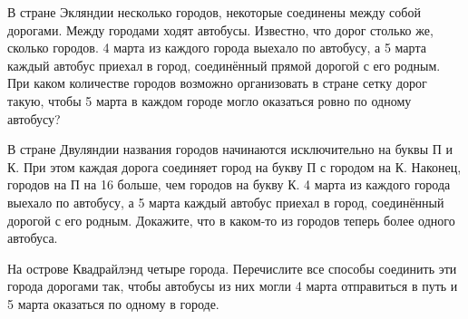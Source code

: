 ﻿
\begin{itemize}

\itA В стране Экляндии несколько городов, некоторые соединены между собой дорогами.
Между городами ходят автобусы. Известно, что дорог столько же, сколько городов.
4 марта из каждого города выехало по автобусу, а 5 марта каждый автобус приехал
в город, соединённый прямой дорогой с его родным. При каком количестве городов
возможно организовать в стране сетку дорог такую, чтобы 5 марта в каждом городе
могло оказаться ровно по одному автобусу?

\itB В стране Двуляндии названия городов начинаются исключительно на буквы П и К. При этом каждая дорога соединяет город на букву П с городом на К. Наконец, городов на П на 16 больше, чем городов на букву К. 4 марта из каждого города выехало по автобусу, а 5 марта каждый автобус приехал в город, соединённый дорогой с его родным. Докажите, что в каком-то из городов теперь более одного автобуса.

\itC На острове Квадрайлэнд четыре города. Перечислите все способы соединить
эти города дорогами так, чтобы автобусы из них могли 4 марта отправиться в путь
и 5 марта оказаться по одному в городе.
\end{itemize}